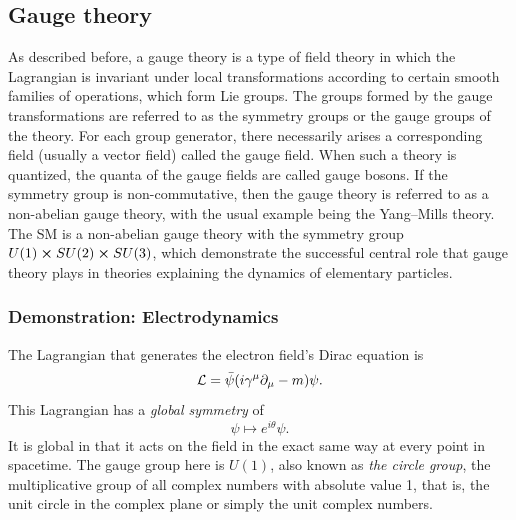 \subsection{Gauge theory}
\label{sec:gauge-theory}

As described before, a gauge theory is a type of field theory in which the Lagrangian is invariant under local transformations according to certain smooth families of operations, which form Lie groups. The groups formed by the gauge transformations are referred to as the symmetry groups or the gauge groups of the theory. For each group generator, there necessarily arises a corresponding field (usually a vector field) called the gauge field. When such a theory is quantized, the quanta of the gauge fields are called gauge bosons. If the symmetry group is non-commutative, then the gauge theory is referred to as a non-abelian gauge theory, with the usual example being the Yang–Mills theory. The SM is a non-abelian gauge theory with the symmetry group $U(1)\cross SU(2)\cross SU(3)$, which demonstrate the successful central role that gauge theory plays in theories explaining the dynamics of elementary particles.

\subsubsection{Demonstration: Electrodynamics}

The Lagrangian that generates the electron field's Dirac equation is
\begin{equation}
\mathcal{L}=\bar{\psi}\qty(i\gamma^{\mu}\partial_{\mu}-m)\psi.
\end{equation}
This Lagrangian has a \emph{global symmetry} of
\begin{equation}
\psi\mapsto e^{i\theta}\psi.
\end{equation}
It is global in that it acts on the field in the exact same way at every point in spacetime. The gauge group here is $U(1)$, also known as \emph{the circle group}, the multiplicative group of all complex numbers with absolute value 1, that is, the unit circle in the complex plane or simply the unit complex numbers.

